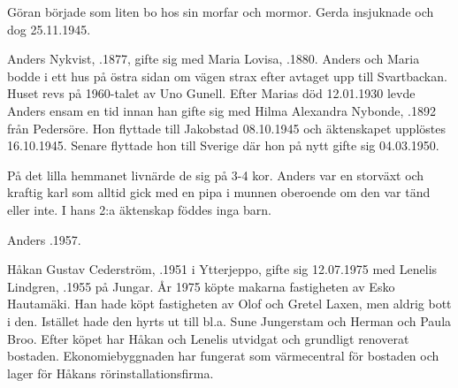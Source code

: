 Göran började som liten bo hos sin morfar och mormor. Gerda insjuknade och dog 25.11.1945.



%


%
Anders Nykvist, .1877, gifte sig med Maria Lovisa, .1880. Anders och Maria bodde i ett hus på östra sidan om vägen strax efter avtaget upp till Svartbackan. Huset revs på 1960-talet av Uno Gunell. Efter Marias död 12.01.1930 levde Anders ensam en tid innan han gifte sig med Hilma Alexandra Nybonde, .1892 från Pedersöre. Hon flyttade till Jakobstad 08.10.1945 och äktenskapet upplöstes 16.10.1945. Senare flyttade hon till Sverige där hon på nytt gifte sig 04.03.1950.

På det lilla hemmanet livnärde de sig på 3-4 kor. Anders var en storväxt och kraftig karl som alltid gick med en pipa i munnen oberoende om den var tänd eller inte. I hans 2:a äktenskap föddes inga barn.
\begin{jhchildren}
  \item {}
  \item {}
  \item {}
  \item {}
  \item {}
  \item {}
\end{jhchildren}

Anders .1957.



%



%
Håkan Gustav Cederström, .1951 i Ytterjeppo, gifte sig 12.07.1975 med Lenelis Lindgren, .1955 på Jungar. År 1975 köpte makarna fastigheten av Esko Hautamäki. Han hade köpt fastigheten av Olof och Gretel Laxen, men aldrig bott i den. Istället hade den hyrts ut till bl.a. Sune Jungerstam och Herman och Paula Broo. Efter köpet har Håkan och Lenelis utvidgat och grundligt renoverat bostaden. Ekonomiebyggnaden har fungerat som värmecentral för bostaden och lager för Håkans rörinstallationsfirma.

